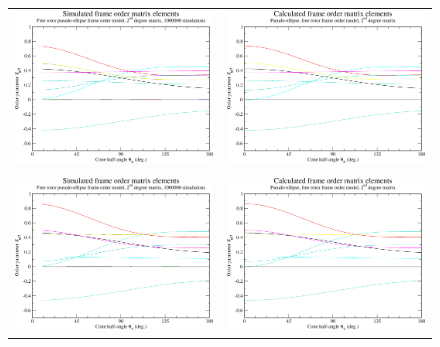 \begin{figure}
\centering
  \begin{tabular}{@{}cc@{}}
    \includegraphics[width=.5\textwidth]{images/frame_order_matrix/Sijkl_pseudo-ellipse_free_rotor_in_frame_theta_x_ens1000000.eps} &
    \includegraphics[width=.5\textwidth]{images/frame_order_matrix/Sijkl_pseudo-ellipse_free_rotor_in_frame_theta_x_calc.eps} \\
    \\[-5pt]
    \includegraphics[width=.5\textwidth]{images/frame_order_matrix/Sijkl_pseudo-ellipse_free_rotor_in_frame_theta_y_ens1000000.eps} &
    \includegraphics[width=.5\textwidth]{images/frame_order_matrix/Sijkl_pseudo-ellipse_free_rotor_in_frame_theta_y_calc.eps} \\

\end{tabular}
\end{figure}

